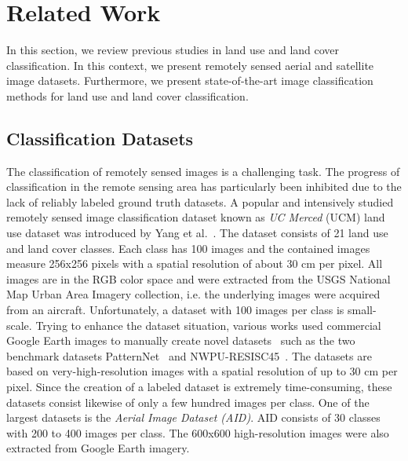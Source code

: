 \documentclass[journal]{IEEEtran}
\begin{document}
\section{Related Work}

In this section, we review previous studies in land use and land cover classification. In this context, we present remotely sensed aerial and satellite image datasets. Furthermore, we present state-of-the-art image classification methods for land use and land cover classification.


\subsection{Classification Datasets}

The classification of remotely sensed images is a challenging task. The progress of classification in the remote sensing area has particularly been inhibited due to the lack of reliably labeled ground truth datasets. A popular and intensively studied~\cite{castelluccio2015land, nogueira2017towards, penatti2015deep, xia2016aid, yang2010bag} remotely sensed image classification dataset known as \textit{UC Merced} (UCM) land use dataset was introduced by Yang et al.~\cite{yang2010bag}. The dataset consists of 21 land use and land cover classes. Each class has 100 images and the contained images measure 256x256 pixels with a spatial resolution of about 30 cm per pixel. All images are in the RGB color space and were extracted from the USGS National Map Urban Area Imagery collection, i.e. the underlying images were acquired from an aircraft. Unfortunately, a dataset with 100 images per class is small-scale. Trying to enhance the dataset situation, various works used commercial Google Earth images to manually create novel datasets~\cite{sheng2012high, xia2016aid, xia2010structural, zhao2016feature} such as the two benchmark datasets PatternNet~\cite{zhou2018patternnet} and NWPU-RESISC45~\cite{cheng2017remote}. The datasets are based on very-high-resolution images with a spatial resolution of up to 30 cm per pixel. Since the creation of a labeled dataset is extremely time-consuming, these datasets consist likewise of only a few hundred images per class. One of the largest datasets is the \textit{Aerial Image Dataset (AID)}. AID consists of 30 classes with 200 to 400 images per class. The 600x600 high-resolution images were also extracted from Google Earth imagery. 
\end{document}
